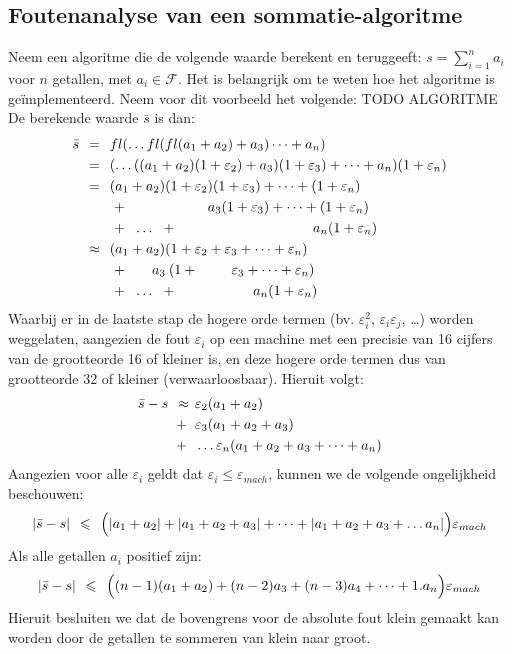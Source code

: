 \documentclass[11pt]{report}
\def \eq {\hspace{1.5mm}=\hspace{1.5mm}}
\def \lesseq {\hspace{1.5mm}\leqslant\hspace{1.5mm}}
\def \appx {\hspace{1.5mm}\approx \hspace{1.5mm}}
\def \h {\hspace{2mm}}
\def \F {\mathcal{F}}
\begin{document}
	 \subsection*{Foutenanalyse van een sommatie-algoritme}
	 	Neem een algoritme die de volgende waarde berekent en teruggeeft: $s = \sum_{i = 1}^n a_i$ voor $n$ getallen, met $a_i \in \F$. Het is belangrijk om te weten hoe het algoritme is ge\"{i}mplementeerd. Neem voor dit voorbeeld het volgende:
	 	TODO ALGORITME
	 	De berekende waarde $\bar s$ is dan:
	 	\begin{align*}
	 		\bar s &\eq fl(\dots fl(fl(a_1 + a_2) + a_3) \dots + a_n)\\
	 		&\eq (\dots ((a_1 + a_2) (1 + \varepsilon_2) + a_3)(1 + \varepsilon_3) + \dots + a_n)(1+\varepsilon_n)\\
	 		&\eq (a_1 + a_2)(1 + \varepsilon_2)(1 + \varepsilon_3) + \dots + (1 + \varepsilon_n)\\
	 		& \hspace{8mm} + \hspace{20mm} a_3 (1 + \varepsilon_3) + \dots + (1 + \varepsilon_n)\\
	 		& \hspace{8mm} + \h \dots \h  + \hspace{34mm} a_n (1 + \varepsilon_n)\\
	 		& \appx (a_1 + a_2)(1 + \varepsilon_2 + \varepsilon_3 + \dots + \varepsilon_n)\\
	 		& \hspace{8mm} + \hspace{6mm} a_3 \hspace{0.8mm}(1 + \hspace{8.3mm}\varepsilon_3 + \dots + \varepsilon_n)\\
	 		& \hspace{8mm} + \h \dots \h  + \hspace{19mm} a_n (1 + \varepsilon_n)
	 	\end{align*}
	 	Waarbij er in de laatste stap de hogere orde termen (bv. $\varepsilon_i^2$, $\varepsilon_i\varepsilon_j$, \dots) worden weggelaten, aangezien de fout $\varepsilon_i$ op een machine met een precisie van 16 cijfers van de grootteorde 16 of kleiner is, en deze hogere orde termen dus van grootteorde 32 of kleiner (verwaarloosbaar). Hieruit volgt:
	 	\begin{align*}
	 		\bar s - s \appx &\varepsilon_2(a_1 + a_2) \\
	 		 +\h &\varepsilon_3 (a_1 + a_2 + a_3) \\
	 		 +\h &\dots \varepsilon_n(a_1 + a_2 + a_3 + \dots + a_n)
	 	\end{align*}
	 	Aangezien voor alle $\varepsilon_i$ geldt dat $\varepsilon_i \leqslant \varepsilon_{mach}$, kunnen we de volgende ongelijkheid beschouwen:
	 	$$|\bar s - s| \lesseq \Bigl( |a_1 + a_2| + |a_1 + a_2 + a_3| + \dots + |a_1 + a_2 + a_3 + \dots a_n|\Bigr)\varepsilon_{mach}$$
	 	Als alle getallen $a_i$ positief zijn:
	 	$$|\bar s - s| \lesseq \Bigl( (n-1)(a_1 + a_2) + (n-2)a_3 + (n-3)a_4 + \dots + 1.a_n\Bigr)\varepsilon_{mach}$$
	 	Hieruit besluiten we dat de bovengrens voor de absolute fout klein gemaakt kan worden door de getallen te sommeren van klein naar groot.
\end{document}
